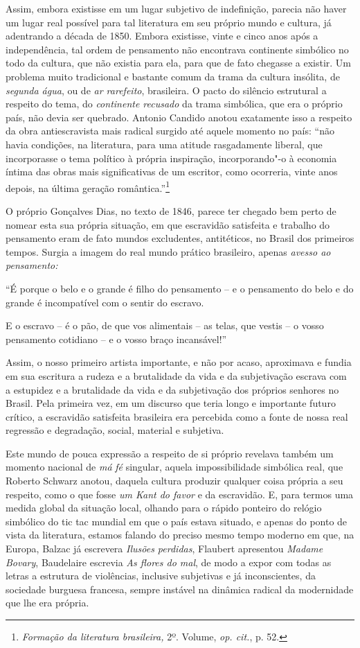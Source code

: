 Assim, embora existisse em um lugar subjetivo de indefinição, parecia
não haver um lugar real possível para tal literatura em seu próprio
mundo e cultura, já adentrando a década de 1850. Embora existisse, vinte
e cinco anos após a independência, tal ordem de pensamento não
encontrava continente simbólico no todo da cultura, que não existia para
ela, para que de fato chegasse a existir. Um problema muito tradicional
e bastante comum da trama da cultura insólita, de \emph{segunda água},
ou de \emph{ar rarefeito}, brasileira. O pacto do silêncio estrutural a
respeito do tema, do \emph{continente recusado} da trama simbólica, que
era o próprio país, não devia ser quebrado. Antonio Candido anotou
exatamente isso a respeito da obra antiescravista mais radical surgido
até aquele momento no país: ``não havia condições, na literatura, para
uma atitude rasgadamente liberal, que incorporasse o tema político à
própria inspiração, incorporando"-o à economia íntima das obras mais
significativas de um escritor, como ocorreria, vinte anos depois, na
última geração romântica.''\footnote{\emph{Formação da literatura
  brasileira,} 2º. Volume, \emph{op. cit.}, p. 52.}

O próprio Gonçalves Dias, no texto de 1846, parece ter chegado bem perto
de nomear esta sua própria situação, em que escravidão satisfeita e
trabalho do pensamento eram de fato mundos excludentes, antitéticos, no
Brasil dos primeiros tempos. Surgia a imagem do real mundo prático
brasileiro, apenas \emph{avesso ao pensamento: }

``É porque o belo e o grande é filho do pensamento -- e o pensamento do
belo e do grande é incompatível com o sentir do escravo.

E o escravo -- é o pão, de que vos alimentais -- as telas, que vestis --
o vosso pensamento cotidiano -- e o vosso braço incansável!''

Assim, o nosso primeiro artista importante, e não por acaso, aproximava
e fundia em sua escritura a rudeza e a brutalidade da vida e da
subjetivação escrava com a estupidez e a brutalidade da vida e da
subjetivação dos próprios senhores no Brasil. Pela primeira vez, em um
discurso que teria longo e importante futuro crítico, a escravidão
satisfeita brasileira era percebida como a fonte de nossa real regressão
e degradação, social, material e subjetiva.

Este mundo de pouca expressão a respeito de si próprio revelava também
um momento nacional de \emph{má} \emph{fé} singular, aquela
impossibilidade simbólica real, que Roberto Schwarz anotou, daquela
cultura produzir qualquer coisa própria a seu respeito, como o que fosse
\emph{um Kant do favor} e da escravidão. E, para termos uma medida
global da situação local, olhando para o rápido ponteiro do relógio
simbólico do tic tac mundial em que o país estava situado, e apenas do
ponto de vista da literatura, estamos falando do preciso mesmo tempo
moderno em que, na Europa, Balzac já escrevera \emph{Ilusões perdidas},
Flaubert apresentou \emph{Madame Bovary}, Baudelaire escrevia \emph{As
flores do mal}, de modo a expor com todas as letras a estrutura de
violências, inclusive subjetivas e já inconscientes, da sociedade
burguesa francesa, sempre instável na dinâmica radical da modernidade
que lhe era própria.

